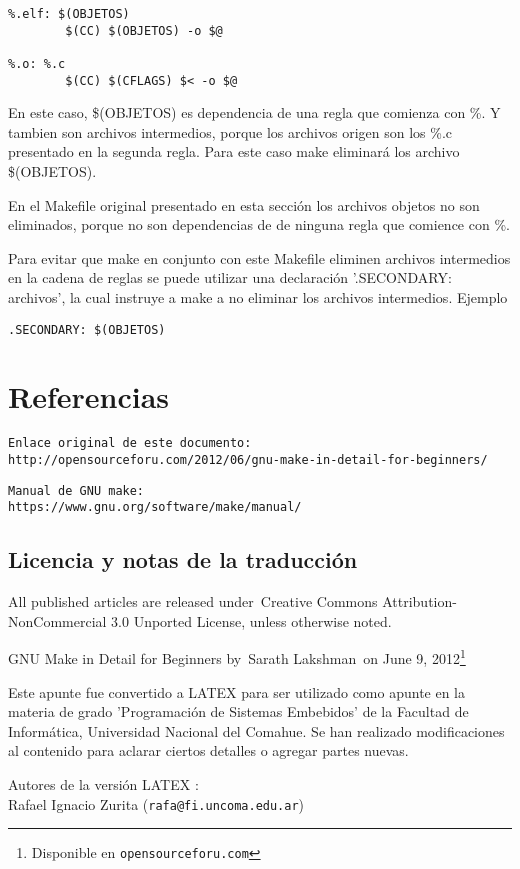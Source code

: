 \documentclass[output=paper, 
colorlinks,
citecolor=brown,
newtxmath
]{langscibook}
\begin{document}
\begin{verbatim}
%.elf: $(OBJETOS)
        $(CC) $(OBJETOS) -o $@

%.o: %.c
        $(CC) $(CFLAGS) $< -o $@
\end{verbatim}

En este caso, \$(OBJETOS) es dependencia de una regla que comienza con \%.
Y tambien son archivos intermedios, porque los archivos origen son los 
\%.c presentado en la segunda regla. Para este caso make eliminará
los archivo \$(OBJETOS).

En el Makefile original presentado en esta sección los archivos objetos
no son eliminados, porque no son dependencias de de ninguna regla que comience con \%.

Para evitar que make en conjunto con este Makefile eliminen archivos
intermedios en la cadena de reglas
se puede utilizar una declaración '.SECONDARY: archivos', la cual instruye a make a no eliminar los archivos intermedios. Ejemplo

\begin{verbatim}
.SECONDARY: $(OBJETOS)
\end{verbatim}

\section {Referencias}

\begin{verbatim}
Enlace original de este documento:
http://opensourceforu.com/2012/06/gnu-make-in-detail-for-beginners/
\end{verbatim}

\begin{verbatim}
Manual de GNU make:
https://www.gnu.org/software/make/manual/
\end{verbatim}

\subsection {Licencia y notas de la traducción}

All published articles are released under Creative Commons 
Attribution-NonCommercial 3.0 Unported License, unless otherwise noted.

GNU Make in Detail for Beginners by Sarath Lakshman on June 9, 2012\footnote{Disponible en 
\texttt{opensourceforu.com}}

Este apunte fue convertido a LATEX para 
ser utilizado como apunte en la materia de grado
'Programación de Sistemas Embebidos' de la Facultad de Informática,
Universidad Nacional del Comahue.
Se han realizado modificaciones
al contenido para aclarar ciertos detalles o agregar partes nuevas.

Autores de la versión LATEX : \\
Rafael Ignacio Zurita (\texttt{rafa@fi.uncoma.edu.ar}) \\
\end{document}

